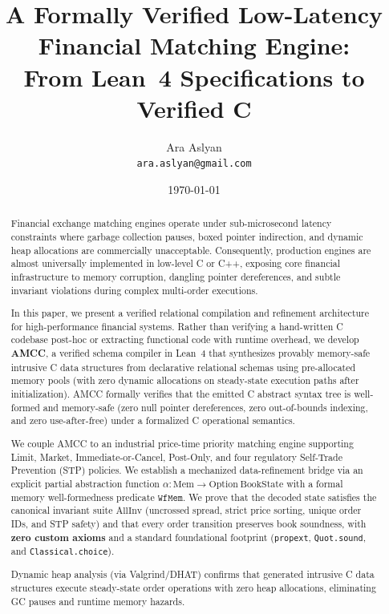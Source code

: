 \documentclass[11pt,a4paper]{article}
\title{\textbf{A Formally Verified Low-Latency Financial Matching Engine:\\
From Lean~4 Specifications to Verified C}}
\author{%
  Ara Aslyan\\
  \texttt{ara.aslyan@gmail.com}
}
\date{\today}
\begin{document}
\maketitle

\begin{abstract}
Financial exchange matching engines operate under sub-microsecond latency constraints where garbage collection pauses, boxed pointer indirection, and dynamic heap allocations are commercially unacceptable. Consequently, production engines are almost universally implemented in low-level C or C++, exposing core financial infrastructure to memory corruption, dangling pointer dereferences, and subtle invariant violations during complex multi-order executions.

In this paper, we present a verified relational compilation and refinement architecture for high-performance financial systems. Rather than verifying a hand-written C codebase post-hoc or extracting functional code with runtime overhead, we develop \textbf{AMCC}, a verified schema compiler in Lean~4 that synthesizes provably memory-safe intrusive C data structures from declarative relational schemas using pre-allocated memory pools (with zero dynamic allocations on steady-state execution paths after initialization). AMCC formally verifies that the emitted C abstract syntax tree is well-formed and memory-safe (zero null pointer dereferences, zero out-of-bounds indexing, and zero use-after-free) under a formalized C operational semantics.

We couple AMCC to an industrial price-time priority matching engine supporting Limit, Market, Immediate-or-Cancel, Post-Only, and four regulatory Self-Trade Prevention (STP) policies. We establish a mechanized data-refinement bridge via an explicit partial abstraction function $\alpha : \text{Mem} \to \text{Option}~\text{BookState}$ with a formal memory well-formedness predicate $\mathtt{WfMem}$. We prove that the decoded state satisfies the canonical invariant suite $\mathrm{AllInv}$ (uncrossed spread, strict price sorting, unique order IDs, and STP safety) and that every order transition preserves book soundness, with \textbf{zero custom axioms} and a standard foundational footprint (\texttt{propext}, \texttt{Quot.sound}, and \texttt{Classical.choice}).

Dynamic heap analysis (via Valgrind/DHAT) confirms that generated intrusive C data structures execute steady-state order operations with zero heap allocations, eliminating GC pauses and runtime memory hazards.
\end{abstract}
\end{document}

